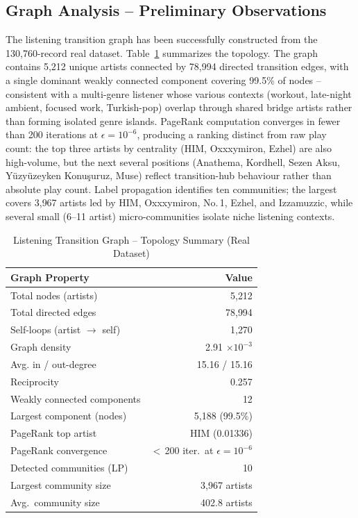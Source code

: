 \documentclass[conference]{IEEEtran}
\begin{document}
\subsection{Graph Analysis -- Preliminary Observations}

The listening transition graph has been successfully constructed from the 130{,}760-record real dataset. Table~\ref{tab:graph} summarizes the topology. The graph contains 5{,}212 unique artists connected by 78{,}994 directed transition edges, with a single dominant weakly connected component covering 99.5\% of nodes -- consistent with a multi-genre listener whose various contexts (workout, late-night ambient, focused work, Turkish-pop) overlap through shared bridge artists rather than forming isolated genre islands. PageRank computation converges in fewer than 200 iterations at $\epsilon{=}10^{-6}$, producing a ranking distinct from raw play count: the top three artists by centrality (HIM, Oxxxymiron, Ezhel) are also high-volume, but the next several positions (Anathema, Kordhell, Sezen Aksu, Yüzyüzeyken Konuşuruz, Muse) reflect transition-hub behaviour rather than absolute play count. Label propagation identifies ten communities; the largest covers 3{,}967 artists led by HIM, Oxxxymiron, No.\,1, Ezhel, and Izzamuzzic, while several small (6--11 artist) micro-communities isolate niche listening contexts.

\begin{table}[ht]
\centering
\caption{Listening Transition Graph -- Topology Summary (Real Dataset)}
\label{tab:graph}
\renewcommand{\arraystretch}{1.2}
\begin{tabular}{p{4.6cm} r}
\toprule
\textbf{Graph Property} & \textbf{Value} \\
\midrule
Total nodes (artists)             & 5{,}212 \\
Total directed edges              & 78{,}994 \\
Self-loops (artist $\rightarrow$ self) & 1{,}270 \\
Graph density                     & 2.91 $\times 10^{-3}$ \\
Avg. in / out-degree              & 15.16 / 15.16 \\
Reciprocity                       & 0.257 \\
Weakly connected components       & 12 \\
Largest component (nodes)         & 5{,}188 (99.5\%) \\
PageRank top artist               & HIM (0.01336) \\
PageRank convergence              & $<$\,200 iter.\ at $\epsilon{=}10^{-6}$ \\
Detected communities (LP)         & 10 \\
Largest community size            & 3{,}967 artists \\
Avg.\ community size              & 402.8 artists \\
\bottomrule
\end{tabular}
\end{table}
\end{document}
